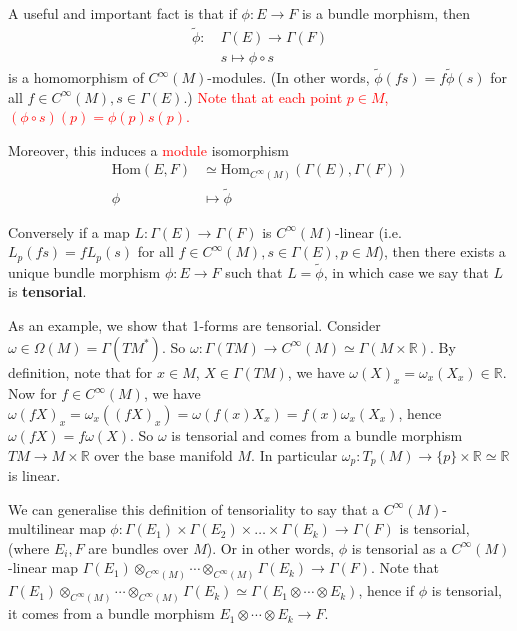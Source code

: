 \documentclass[a4paper]{article}
\theoremstyle{definition} \newtheorem*{definition}{Definition}
\theoremstyle{definition} \newtheorem*{definitions}{Definitions}
\theoremstyle{plain} \newtheorem{theorem}{Theorem}[section]
\theoremstyle{plain} \newtheorem{proposition}[theorem]{Proposition}
\theoremstyle{plain} \newtheorem{corollary}[theorem]{Corollary}
\theoremstyle{plain} \newtheorem{lemma}[theorem]{Lemma}
\theoremstyle{plain} \newtheorem{example}[theorem]{Example}
\newcommand{\checkCorrect}[1]{\textcolor{red}{#1}}
\newcommand{\defn}[1]{\textbf{#1}}
\newcommand{\realnos}{\mathbb{R}}
\newcommand{\smooth}{C^\infty}
\begin{document}
A useful and important fact is that if $\phi:E\to F$ is a bundle morphism, then 
\begin{align*}
\tilde{\phi}:\ & \Gamma(E)\to \Gamma(F) \\
& s \mapsto \phi \circ s
\end{align*}
is a homomorphism of $C^\infty(M)$-modules. (In other words, $\tilde{\phi}(fs)=f\tilde{\phi}(s)$ for all $f\in C^\infty (M), s\in \Gamma(E)$.) \checkCorrect{Note that at each point $p\in M$, $(\phi\circ s)(p)=\phi(p)s(p)$.}

Moreover, this induces a \checkCorrect{module} isomorphism 
\begin{align*}
\text{Hom}(E, F) & \simeq \text{Hom}_{C^\infty (M)}(\Gamma(E), \Gamma(F)) \\
\phi & \mapsto \tilde{\phi} 
\end{align*}

Conversely if a map $L:\Gamma(E)\to \Gamma(F)$ is $C^\infty(M)$-linear (i.e. $L_p(fs)=fL_p(s)$ for all $f\in C^\infty (M), s\in \Gamma(E), p\in M$), then there exists a unique bundle morphism $\phi:E\to F$ such that $L=\tilde{\phi}$, in which case we say that $L$ is \defn{tensorial}. 

As an example, we show that 1-forms are tensorial. Consider $\omega\in \Omega(M) = \Gamma(TM^*)$. So $\omega:\Gamma(TM)\to \smooth (M)\simeq \Gamma(M\times \realnos)$. By definition, note that for $x\in M$, $X\in \Gamma(TM)$, we have $\omega(X)_x = \omega_x(X_x)\in \realnos$. Now for $f\in \smooth(M)$, we have $\omega(fX)_x = \omega_x((fX)_x)= \omega(f(x)X_x) = f(x)\omega_x(X_x)$, hence $\omega(fX)=f \omega(X)$. So $\omega$ is tensorial and comes from a bundle morphism $TM\to M\times \realnos$ over the base manifold $M$. In particular $\omega_p:T_p(M)\to \{p\} \times \realnos \simeq \realnos$ is linear.  

We can generalise this definition of tensoriality to say that a $\smooth(M)$-multilinear map $\phi:\Gamma(E_1)\times \Gamma(E_2)\times \ldots \times \Gamma(E_k)\to \Gamma(F)$ is tensorial, (where $E_i, F$ are bundles over $M$). Or in other words, $\phi$ is tensorial as a $\smooth(M)$-linear map $\Gamma(E_1)\otimes_{\smooth(M)} \cdots \otimes_{\smooth(M)} \Gamma(E_k)\to \Gamma(F)$. Note that $\Gamma(E_1)\otimes_{\smooth(M)} \cdots \otimes_{\smooth(M)} \Gamma(E_k)\simeq \Gamma(E_1\otimes \cdots \otimes E_k)$, hence if $\phi$ is tensorial, it comes from a bundle morphism $E_1\otimes \cdots \otimes E_k\to F$.
\end{document}

